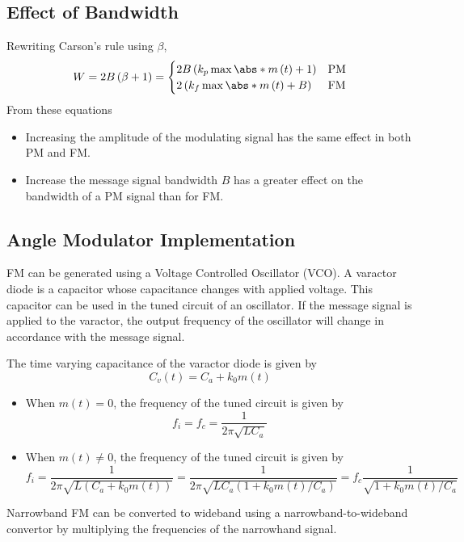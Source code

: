 \documentclass{article}
\begin{document}
\subsection{Effect of Bandwidth}
Rewriting Carson's rule using \(\beta\),
\begin{equation*}
    W = 2B \left( \beta + 1 \right) =
    \begin{cases}
        2B \left( k_p \max{\abs*{m\left( t \right)}} + 1 \right) & \text{PM} \\
        2 \left( k_f \max{\abs*{m\left( t \right)}} + B \right) & \text{FM}
    \end{cases}
\end{equation*}
From these equations
\begin{itemize}
    \item Increasing the amplitude of the modulating signal has the same effect in both PM and FM.
    \item Increase the message signal bandwidth \(B\) has a greater effect on the bandwidth of a PM signal than for FM.
\end{itemize}
\subsection{Angle Modulator Implementation}
FM can be generated using a Voltage Controlled Oscillator (VCO). A varactor diode is a capacitor whose capacitance changes
with applied voltage. This capacitor can be used in the tuned circuit of an oscillator.
If the message signal is applied to the varactor, the output frequency of the oscillator will change in accordance
with the message signal.

The time varying capacitance of the varactor diode is given by
\begin{equation*}
    C_v\left( t \right) = C_a + k_0 m\left( t \right)
\end{equation*}
\begin{itemize}
    \item When \(m\left( t \right) = 0\), the frequency of the tuned circuit is given by
    \begin{equation*}
        f_i = f_c = \frac{1}{2 \pi \sqrt{L C_a}}
    \end{equation*}
    \item When \(m\left( t \right) \neq 0\), the frequency of the tuned circuit is given by
    \begin{equation*}
        f_i = \frac{1}{2 \pi \sqrt{L \left( C_a + k_0 m\left( t \right) \right)}} = \frac{1}{2 \pi \sqrt{L C_a \left( 1 + k_0 m\left( t \right) / C_a \right)}} = f_c \frac{1}{\sqrt{1 + k_0 m\left( t \right) / C_a}}
    \end{equation*}
\end{itemize}
Narrowband FM can be converted to wideband using a narrowband-to-wideband convertor by multiplying the frequencies of the narrowhand signal.
\end{document}
